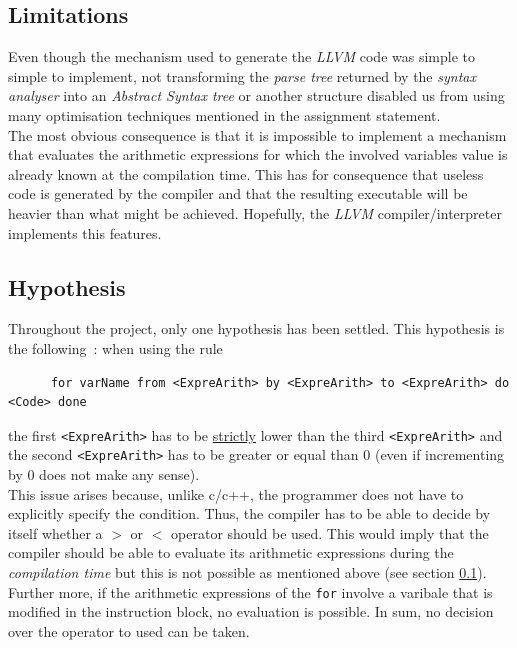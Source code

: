 \documentclass[a4paper,11pt]{article}
\begin{document}
  \subsection{Limitations}
    \label{semantic-limitations}
    Even though the mechanism used to generate the \textit{LLVM} code was simple to simple to implement, not transforming the \textit{parse tree} returned by the \textit{syntax analyser} into an \textit{Abstract Syntax tree} or another structure disabled us from using many optimisation techniques mentioned in the assignment statement.\\
    The most obvious consequence is that it is impossible to implement a mechanism that evaluates the arithmetic expressions for which the involved variables value is already known at the compilation time. This has for consequence that useless code is generated by the compiler and that the resulting executable will be heavier than what might be achieved. Hopefully, the \textit{LLVM} compiler/interpreter implements this features.
  
  \subsection{Hypothesis}
    Throughout the project, only one hypothesis has been settled. This hypothesis is the following~: when using the rule
    \begin{verbatim}
      for varName from <ExpreArith> by <ExpreArith> to <ExpreArith> do <Code> done
    \end{verbatim}
    the first \verb|<ExpreArith>| has to be \underline{strictly} lower than the third \verb|<ExpreArith>| and the second \verb|<ExpreArith>| has to be greater or equal than $0$ (even if incrementing by $0$ does not make any sense).\\
    This issue arises because, unlike c/c++, the programmer does not have to explicitly specify the condition. Thus, the compiler has to be able to decide by itself whether a $>$ or $<$ operator should be used. This would imply that the compiler should be able to evaluate its arithmetic expressions during the \textit{compilation time} but this is not possible as mentioned above (see section \ref{semantic-limitations}). Further more, if the arithmetic expressions of the \verb|for| involve a varibale that is modified in the instruction block, no evaluation is possible. In sum, no decision over the operator to used can be taken.
  
\end{document}
